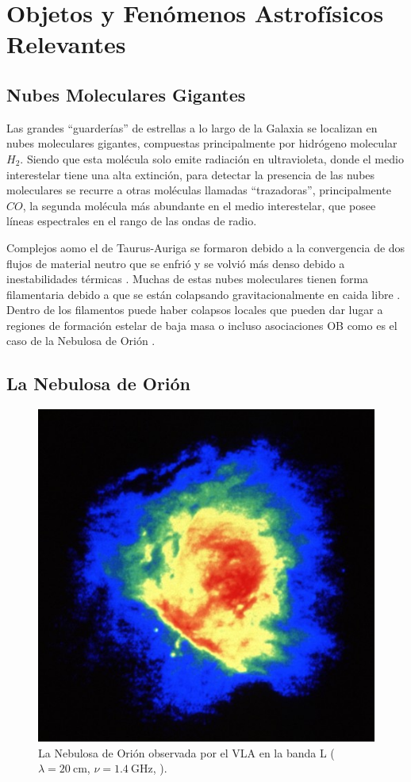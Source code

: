 \chapter{Objetos y Fenómenos Astrofísicos Relevantes}
\section{Nubes Moleculares Gigantes}

Las grandes ``guarderías'' de estrellas a lo largo de la Galaxia se localizan en nubes moleculares gigantes, compuestas principalmente por hidrógeno molecular $H_2$.
Siendo que esta molécula solo emite radiación en ultravioleta, donde el medio interestelar tiene una alta extinción, para detectar la presencia de las nubes moleculares se recurre a otras moléculas llamadas ``trazadoras'', principalmente $CO$, la segunda molécula más abundante en el medio interestelar, que posee líneas espectrales en el rango de las ondas de radio.

Complejos aomo el de Taurus-Auriga se formaron debido a la convergencia de dos flujos de material neutro \citep{Ballesteros:1999} que se enfrió y se volvió más denso debido a inestabilidades térmicas \citep{Hennebelle:1999}. Muchas de estas nubes moleculares tienen forma filamentaria debido a que se están colapsando gravitacionalmente en caida libre \citep{Ballesteros:2011}. Dentro de los filamentos puede haber colapsos locales que pueden dar lugar a regiones de formación estelar de baja masa o incluso asociaciones OB como es el caso de la Nebulosa de Orión \citep{Hartmann:2007}.

\section{La Nebulosa de Orión}

\begin{figure}
    \includegraphics[width=0.5\linewidth]{./Figures/OrionVR13A} 
  \caption{La Nebulosa de Orión observada por el VLA en la banda L ($\lambda = 20\mathrm{~cm}$, $\nu = 1.4\mathrm{~GHz}$, \citet{Yusef:1990}).}
\end{figure}

